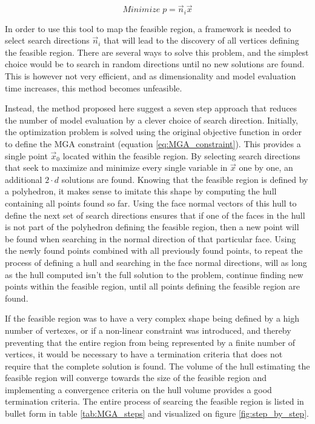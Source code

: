 \begin{equation}\label{eq:objective_func_face_normal}
Minimize \; p = \vec{n}_i\vec{x}
\end{equation}

In order to use this tool to map the feasible region, a framework is needed to select search directions $\vec{n}_i$ that will lead to the discovery of all vertices defining the feasible region. There are several ways to solve this problem, and the simplest choice would be to search in random directions until no new solutions are found. This is however not very efficient, and as dimensionality and model evaluation time increases, this method becomes unfeasible. 

Instead, the method proposed here suggest a seven step approach that reduces the number of model evaluation by a clever choice of search direction. Initially, the optimization problem is solved using the original objective function in order to define the MGA constraint (equation \ref{eq:MGA_constraint}). This provides a single point $\vec{x}_0$ located within the feasible region. By selecting search directions that seek to maximize and minimize every single variable in $\vec{x}$ one by one, an additional $2\cdot d$ solutions are found. Knowing that the feasible region is defined by a polyhedron, it makes sense to imitate this shape by computing the hull containing all points found so far. Using the face normal vectors of this hull to define the next set of search directions ensures that if one of the faces in the hull is not part of the polyhedron defining the feasible region, then a new point will be found when searching in the normal direction of that particular face. Using the  newly found points combined with all previously found points, to repeat the process of defining a hull and searching in the face normal directions, will as long as the hull computed isn't the full solution to the problem, continue finding new points within the feasible region, until all points defining the feasible region are found. 

If the feasible region was to have a very complex shape being defined by a high number of vertexes, or if a non-linear constraint was introduced, and thereby preventing that the entire region from being represented by a finite number of vertices, it would be necessary to have a termination criteria that does not require that the complete solution is found. The volume of the hull estimating the feasible region will converge towards the size of the feasible region and implementing a convergence criteria on the hull volume provides a good termination criteria. The entire process of searcing the feasible region is listed in bullet form in table \ref{tab:MGA_steps} and visualized on figure \ref{fig:step_by_step}.

